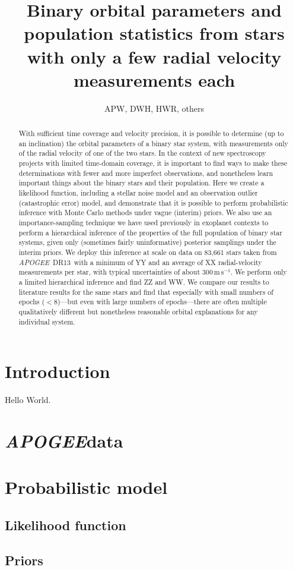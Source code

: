 \documentclass[12pt, preprint]{aastex}
\newcommand{\project}[1]{\textsl{#1}}
\newcommand{\acronym}[1]{{\small{#1}}}
\newcommand{\apogee}{\project{\acronym{APOGEE}}}
\newcommand{\dr}{\acronym{DR13}}
\newcommand{\meterspersecond}{\mathrm{m\,s^{-1}}}
\begin{document}
\title{Binary orbital parameters and population statistics
  from stars with only a few radial velocity measurements each}
\author{APW, DWH, HWR, others}

\begin{abstract}
With sufficient time coverage and velocity precision, it is possible
to determine (up to an inclination) the orbital parameters of a binary
star system, with measurements only of the radial velocity of one of
the two stars.
In the context of new spectroscopy projects with limited time-domain
coverage, it is important to find ways to make these determinations
with fewer and more imperfect observations, and nonetheless learn
important things about the binary stars and their population.
Here we create a likelihood function, including a stellar noise model and
an observation outlier (catastrophic error) model, and demonstrate
that it is possible to perform probabilistic inference with Monte
Carlo methods under vague (interim) priors.
We also use an importance-sampling technique we have used previously
in exoplanet contexts to perform a hierarchical inference of the
properties of the full population of binary star systems, given only
(sometimes fairly uninformative) posterior samplings under the interim
priors.
We deploy this inference at scale on data on 83,661 stars taken from
\apogee\ \dr\, with a minimum of YY and an average of XX
radial-velocity measurements per star, with typical uncertainties of
about $300\,\meterspersecond$.
We perform only a limited hierarchical inference and find ZZ and WW.
We compare our results to literature results for the same stars and
find that especially with small numbers of epochs ($<8$)---but even
with large numbers of epochs---there are often multiple qualitatively
different but nonetheless reasonable orbital explanations for any
individual system.
\end{abstract}


\section{Introduction} \label{sec:intro}

Hello World.

\section{\apogee data} \label{sec:data}

\section{Probabilistic model}\label{sec:prob-model}

\subsection{Likelihood function} \label{sec:likelihood}

\subsection{Priors} \label{sec:priors}
\end{document}
